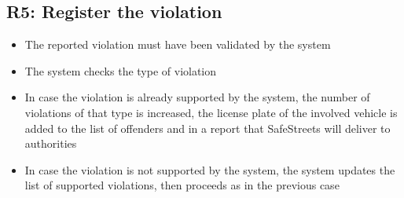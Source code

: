 \subsection{R5: Register the violation}
\begin{itemize}
    \item The reported violation must have been validated by the system
    \item The system checks the type of violation
    \item In case the violation is already supported by the system, the number of violations of that type is increased, the license plate of the involved vehicle is added to the list of offenders and in a report that SafeStreets will deliver to authorities
    \item In case the violation is not supported by the system, the system updates the list of supported violations, then proceeds as in the previous case
\end{itemize}
